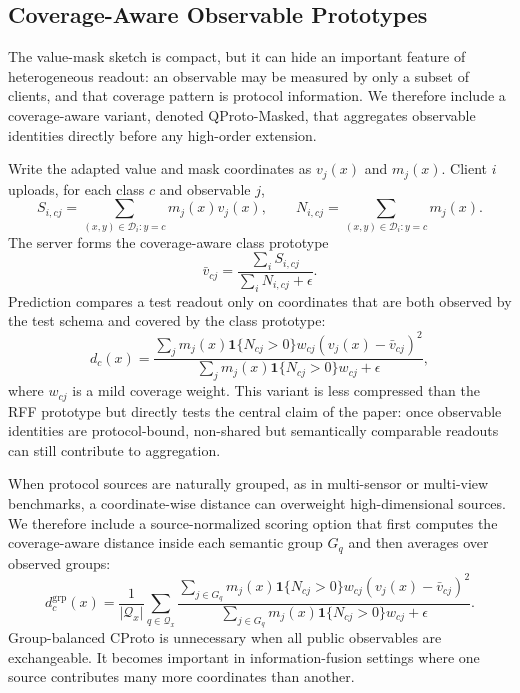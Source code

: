 \documentclass[preprint]{elsarticle}
\newcommand{\method}{QProto}
\newcommand{\cD}{\mathcal{D}}
\begin{document}
\subsection{Coverage-Aware Observable Prototypes}

The value-mask sketch is compact, but it can hide an important feature of heterogeneous readout: an observable may be measured by only a subset of clients, and that coverage pattern is protocol information. We therefore include a coverage-aware variant, denoted \method{}-Masked, that aggregates observable identities directly before any high-order extension.

Write the adapted value and mask coordinates as \(v_j(x)\) and \(m_j(x)\). Client \(i\) uploads, for each class \(c\) and observable \(j\),
\begin{equation}
    S_{i,cj}=\sum_{(x,y)\in\cD_i:y=c}m_j(x)v_j(x),
    \qquad
    N_{i,cj}=\sum_{(x,y)\in\cD_i:y=c}m_j(x).
\end{equation}
The server forms the coverage-aware class prototype
\begin{equation}
    \bar v_{cj}=
    \frac{\sum_i S_{i,cj}}{\sum_i N_{i,cj}+\epsilon}.
\end{equation}
Prediction compares a test readout only on coordinates that are both observed by the test schema and covered by the class prototype:
\begin{equation}
    d_c(x)=
    \frac{
    \sum_j m_j(x)\mathbf{1}\{N_{cj}>0\}w_{cj}
    (v_j(x)-\bar v_{cj})^2
    }{
    \sum_j m_j(x)\mathbf{1}\{N_{cj}>0\}w_{cj}+\epsilon
    },
\end{equation}
where \(w_{cj}\) is a mild coverage weight. This variant is less compressed than the RFF prototype but directly tests the central claim of the paper: once observable identities are protocol-bound, non-shared but semantically comparable readouts can still contribute to aggregation.

When protocol sources are naturally grouped, as in multi-sensor or multi-view benchmarks, a coordinate-wise distance can overweight high-dimensional sources. We therefore include a source-normalized scoring option that first computes the coverage-aware distance inside each semantic group \(G_q\) and then averages over observed groups:
\begin{equation}
    d_c^{\mathrm{grp}}(x)=
    \frac{1}{|\mathcal{Q}_x|}
    \sum_{q\in\mathcal{Q}_x}
    \frac{\sum_{j\in G_q} m_j(x)\mathbf{1}\{N_{cj}>0\}w_{cj}(v_j(x)-\bar v_{cj})^2}
    {\sum_{j\in G_q} m_j(x)\mathbf{1}\{N_{cj}>0\}w_{cj}+\epsilon}.
\end{equation}
Group-balanced CProto is unnecessary when all public observables are exchangeable. It becomes important in information-fusion settings where one source contributes many more coordinates than another.
\end{document}
